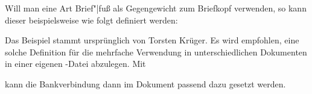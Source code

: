 \begin{Example}
  Will man eine Art Brief"|fuß als Gegengewicht zum Briefkopf verwenden, so
  kann dieser beispielsweise wie folgt definiert werden:
\begin{lstcode}
\end{lstcode}
  Das Beispiel stammt ursprünglich von Torsten Krüger. Es wird empfohlen, eine
  solche Definition für die mehrfache Verwendung in unterschiedlichen
  Dokumenten in einer eigenen
  -Datei abzulegen. Mit
\begin{lstcode}
\end{lstcode}
  kann die Bankverbindung dann im Dokument passend dazu gesetzt werden.%
\iffalse%
  \ Abhängig\textnote{Achtung!} von den Voreinstellungen ist ein solch hoher
  Fuß jedoch eventuell nicht vorgesehen und wird deshalb möglicherweise zu
  tief platziert. In einem solchen Fall kann die vertikale Position über die
  Pseudolänge \DescRef{scrlttr2-experts.plength.firstfootvpos}%
  \important{\DescRef{scrlttr2-experts.plength.firstfootvpos}}%
  \IndexPLength{firstfootvpos} angepasst werden (siehe
  \DescPageRef{scrlttr2-experts.plength.firstfootvpos}).%
\fi
\end{Example}


